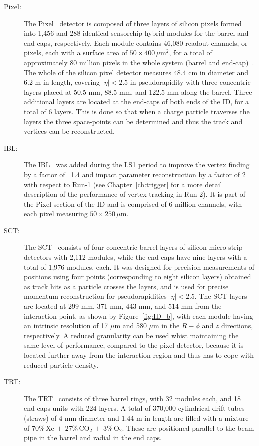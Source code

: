 	\begin{description}
	\item[\ac{Pixel}:] 
	The \ac{Pixel}~\cite{Pixelbib} detector is composed of three layers of silicon pixels formed into 1,456 and 288  identical sensorchip-hybrid modules for the barrel and end-caps, respectively. 
	Each module contains 46,080 readout channels, or pixels, each with a surface area of $50\times400\,\mu\mathrm{m}^2$, for a total of approximately 80 million pixels in the whole system (barrel and end-cap)~\cite{ATLASPix}. The whole of the silicon pixel detector measures 48.4 cm in diameter and 6.2 m in length, covering $|\eta|<2.5$ in pseudorapidity with three concentric layers placed at 50.5 mm, 88.5 mm, and 122.5 mm along the barrel. Three additional layers are located at the end-caps of both ends of the \ac{ID}, for a total of 6 layers. This is done so that when a charge particle traverses the layers the three space-points can be determined and thus the track and vertices can be reconstructed. 
	\item[\ac{IBL}:] 
		The \ac{IBL}~\cite{IBLTDR} was added during the \ac{LS1} period to improve the vertex finding by a factor of ~1.4 and impact parameter reconstruction by a factor of 2 with respect to Run-1 (see Chapter~\ref{ch:trigger} for a more detail description of the performance of vertex tracking in Run 2). It is part of the Pixel section of the \ac{ID} and is comprised of 6 million channels, with each pixel measuring $50\times250\,\mu$m. 
	\item[\ac{SCT}:] 
		The \ac{SCT}~\cite{AHMAD200798} consists of four concentric barrel layers of silicon micro-strip detectors with 2,112 modules, while the end-caps have nine layers with a total of 1,976 modules, each.
		It was designed for precision measurements of positions using four points (corresponding to eight silicon layers) obtained as track hits as a particle crosses the layers, and is used for precise momentum reconstruction for pseudorapidities $|\eta|<2.5$.
		The \ac{SCT} layers are located at 299 mm, 371 mm, 443 mm, and 514 mm from the interaction point, as shown by Figure~\ref{fig:ID_b}, with each module having an intrinsic resolution of 17 $\mu$m and 580 $\mu$m in the $R-\phi$ and $z$ directions, respectively. 
		A reduced granularity can be used whist maintaining the same level of performance, compared to the pixel detector, because it is located further away from the interaction region and thus has to cope with reduced particle density.		
	\item[\ac{TRT}:]
	The \ac{TRT}~\cite{TRT2012} consists of three barrel rings, with 32 modules each, and 18 end-caps units with 224 layers. A total of 370,000 cylindrical drift tubes (straws) of 4 mm diameter and 1.44 m in length are filled with a mixture of $70\%\,\mathrm{Xe}\,+\,27\%\,\mathrm{CO}_2\,+\,3\%\,\mathrm{O}_2$. These are positioned parallel to the beam pipe in the barrel and radial in the end caps. 

\end{description}
